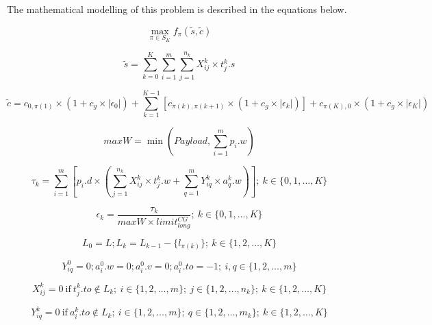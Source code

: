 \documentclass[preprint,authoryear]{elsarticle}
\begin{document}
The mathematical modelling of this problem is described in the equations below.


\begin{equation} \label{eq:maxf}
	\max_{\pi \in S_K} f_\pi(\tilde{s},\tilde{c})
\end{equation}

\begin{equation} \label{eq:scores}
	\tilde{s} = \sum_{k=0}^{K} \sum_{i=1}^{m} \sum_{j=1}^{n_k} X_{ij}^k \times t_j^k.s
\end{equation}

\begin{equation} \label{eq:costs}
	\tilde{c} = c_{0,\pi(1)}\times(1+c_g\times|\epsilon_0|) + \sum_{k=1}^{K-1} [ c_{\pi(k), \pi(k+1)}\times(1+c_g\times|\epsilon_k|) ] + c_{\pi(K),0}\times(1+c_g\times|\epsilon_K|)
\end{equation}

\begin{equation} \label{eq:maxW}
	maxW = \min(Payload, \sum_{i=1}^{m}p_i.w)
\end{equation}

\begin{equation} \label{eq:tau}
\tau_k = \sum_{i=1}^{m}[ p_i.d \times (\sum_{j=1}^{n_k} X_{ij}^k \times t_j^k.w +  \sum_{q=1}^{m} Y_{iq}^k \times a_q^k.w)];\ k \in \{0, 1, \ldots, K\}
\end{equation}

\begin{equation} \label{eq:eps}
\epsilon_k = \frac{\tau_k}{maxW \times limit^{CG}_{long}};\ k \in \{0, 1, \ldots, K\}
\end{equation}

\begin{equation} \label{eq:pdp11}
	L_0 = L; L_{k} = L_{k-1} - \{l_{\pi(k)}\}; \ k \in \{1, 2, \ldots, K\}
\end{equation}

\begin{equation} \label{eq:pdp13}
	Y^0_{iq} = 0; a^0_i.w = 0; a^0_i.v = 0; a^0_i.to = -1;\ i,q \in \{1, 2, \ldots, m\}
\end{equation}

\begin{equation} \label{eq:pdp12}
	X_{ij}^k = 0 \ \mbox{if} \ t_j^k.to \notin L_k; \ i \in \{1, 2, \ldots, m\}; \ j \in \{1, 2, \ldots, n_k\}; \ k \in \{1,2, \ldots, K\}
\end{equation}

\begin{equation} \label{eq:pdp9}
	Y_{iq}^k = 0 \ \mbox{if} \ a_i^k.to \notin L_k; \ i \in \{1, 2, \ldots, m\}; \ q \in \{1, 2, \ldots, m_k\}; \ k \in \{ 1, 2, \ldots, K\}
\end{equation}
\end{document}
